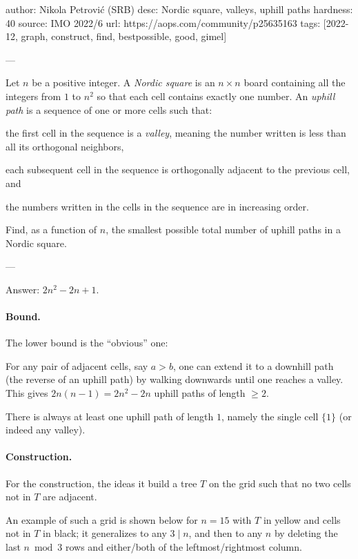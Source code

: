 author: Nikola Petrovi\'{c} (SRB)
desc: Nordic square, valleys, uphill paths
hardness: 40
source: IMO 2022/6
url: https://aops.com/community/p25635163
tags: [2022-12, graph, construct, find, bestpossible, good, gimel]

---

Let $n$ be a positive integer.
A \emph{Nordic square} is an $n \times n$ board
containing all the integers from $1$ to $n^2$
so that each cell contains exactly one number.
An \emph{uphill path} is a sequence of one or more cells such that:
\begin{enumerate}
  \ii the first cell in the sequence is a \emph{valley},
  meaning the number written is less than all its orthogonal neighbors,

  \ii each subsequent cell in the sequence is orthogonally
  adjacent to the previous cell, and

  \ii the numbers written in the cells in the sequence are in increasing order.
\end{enumerate}
Find, as a function of $n$, the smallest possible total number
of uphill paths in a Nordic square.

---

Answer: $2n^2-2n+1$.

\paragraph{Bound.}
The lower bound is the ``obvious'' one:
\begin{itemize}
  \ii For any pair of adjacent cells, say $a > b$,
  one can extend it to a downhill path (the reverse of an uphill path)
  by walking downwards until one reaches a valley.
  This gives $2n(n-1)=2n^2-2n$ uphill paths of length $\ge 2$.

  \ii There is always at least one uphill path of length $1$,
  namely the single cell $\{1\}$ (or indeed any valley).
\end{itemize}

\paragraph{Construction.}
For the construction, the ideas it build a tree $T$ on the grid
such that no two cells not in $T$ are adjacent.

An example of such a grid is shown below for $n=15$ with $T$ in yellow
and cells not in $T$ in black; it generalizes to any $3 \mid n$,
and then to any $n$ by deleting the last $n \bmod 3$ rows
and either/both of the leftmost/rightmost column.

